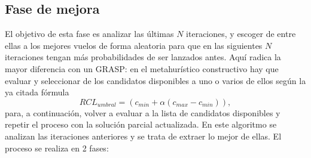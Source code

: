\subsection{Fase de mejora}
El objetivo de esta fase es analizar las últimas $N$ iteraciones, y escoger de entre ellas a los mejores vuelos de forma aleatoria para que en las siguientes $N$ iteraciones tengan más probabilidades de ser lanzados antes. Aquí radica la mayor diferencia con un GRASP: en el metahurístico constructivo hay que evaluar y seleccionar de los candidatos disponibles a uno o varios de ellos según la ya citada fórmula
\begin{equation}
{RCL}_{umbral} = (c_{min}+\alpha(c_{max} - c_{min} )),
\end{equation}
para, a continuación, volver a evaluar a la lista de candidatos disponibles y repetir el proceso con la solución parcial actualizada. En este algoritmo se analizan las iteraciones anteriores y se trata de extraer lo mejor de ellas. El proceso se realiza en 2 fases: 
